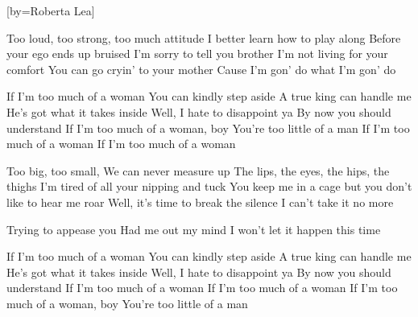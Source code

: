 [by={Roberta Lea}]

  
  \beginverse
  Too loud, too strong, too much attitude
  I better learn how to play along
  Before your ego ends  up bruised
  I'm sorry to tell you brother
  I'm not living for your comfort
  You can go cryin' to your mother
  Cause I'm gon' do what I'm gon' do
  \endverse
  
  \beginchorus
  If I'm too much of a woman
  You can kindly step aside
  A true king can handle me
  He's got what it  takes inside
  Well, I hate to disappoint ya
  By now you should  understand
  If I'm too much of a woman,  boy
  You're too little of a man
  If I'm too much of a woman
  If I'm too much of a woman
  \endchorus
  
  \beginverse
  Too big, too small,
  We can never measure up
  The lips, the eyes, the hips, the thighs
  I'm tired of all your nipping and tuck
  You keep me in a cage but you don't like to hear me roar
  Well, it's time to break the silence
  I can't take it no more
  \endverse
  
  
  \beginverse
  Trying to appease you
  Had me out my mind
  I won't let it happen this time
  \endverse
  
  
  \beginchorus
  If I'm too much of a woman
  You can kindly step aside
  A true king can handle me
  He's got what it  takes inside
  Well, I hate to disappoint ya
  By now you should  understand
  If I'm too much of a woman 
  If I'm too much of a woman 
  If I'm too much of a woman,  boy
  You're too little of a man
  \endchorus
\endsong
